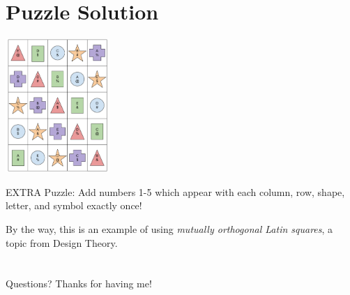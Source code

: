 \documentclass{beamer}
\theoremstyle{theorem}
\theoremstyle{definition}
\newcommand{\<}{\langle}
\renewcommand{\>}{\rangle}
\newcommand{\vpause}{\pause\vspace{1em}}
\begin{document}
\section{Puzzle Solution}

\begin{frame}\small
  \centerline{\includegraphics[height=2in]{safeAndSecuredSol.pdf}}

  \pause

  EXTRA Puzzle: Add numbers 1-5 which appear with each column, row,
  shape, letter, and symbol exactly once!

  \vpause

  By the way, this is an example of using \textit{mutually orthogonal
  Latin squares}, a topic from Design Theory.
\end{frame}

\section*{}

\begin{frame}
Questions? Thanks for having me!
\end{frame}
\end{document}
